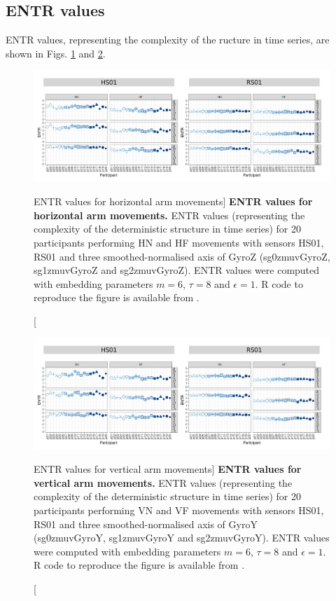\newpage
\subsection{ENTR values}
ENTR values, representing the complexity of the ructure in time series,
are shown in Figs. \ref{fig:entr_aH} and \ref{fig:entr_aV}.

\begin{figure}
\centering
\includegraphics[width=1.0\textwidth]{entr_aH}
    \caption
	[ENTR values for horizontal arm movements]{
	{\bf ENTR values for horizontal arm movements.}
    	ENTR values (representing the complexity of the deterministic 
	structure in time series) for 
	20 participants performing HN and HF movements
	with sensors HS01, RS01 and three smoothed-normalised axis 
	of GyroZ (sg0zmuvGyroZ, sg1zmuvGyroZ and sg2zmuvGyroZ).
	ENTR values were computed with 
	embedding parameters $m=6$, $\tau=8$ and $\epsilon=1$.
	R code to reproduce the figure is available from \cite{hwum2018}.
        }
    \label{fig:entr_aH}
\end{figure}
\begin{figure}
\centering
\includegraphics[width=1.0\textwidth]{entr_aV}
    \caption
	[ENTR values for vertical arm movements]{
	{\bf ENTR values for vertical arm movements.}
    	ENTR values (representing the complexity of the deterministic 
	structure in time series) for 
	20 participants performing VN and VF movements
	with sensors HS01, RS01 and three smoothed-normalised axis 
	of GyroY (sg0zmuvGyroY, sg1zmuvGyroY and sg2zmuvGyroY).
	ENTR values were computed with 
	embedding parameters $m=6$, $\tau=8$ and $\epsilon=1$.
	R code to reproduce the figure is available from \cite{hwum2018}.
        }
    \label{fig:entr_aV}
\end{figure}





